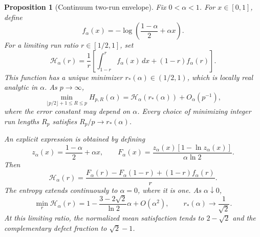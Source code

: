 \documentclass[11pt,a4paper]{article}
\newtheorem{proposition}[theorem]{Proposition}
\begin{document}
\begin{proposition}[Continuum two-run envelope]
\label{prop:continuum_two_run}
Fix $0<\alpha<1$.  For $x\in[0,1]$, define
\[
    f_\alpha(x)=-\log\left(\frac{1-\alpha}{2}+\alpha x\right).
\]
For a limiting run ratio $r\in[1/2,1]$, set
\begin{equation}
\label{eq:continuum_envelope}
    \mathcal H_\alpha(r)=\frac1r\left[
        \int_{1-r}^{r}f_\alpha(x)\,dx+(1-r)f_\alpha(r)
    \right].
\end{equation}
This function has a unique minimizer $r_*(\alpha)\in(1/2,1)$,
which is locally real analytic in $\alpha$.  As $p\to\infty$,
\begin{equation}
\label{eq:continuum_limit}
    \min_{\lfloor p/2\rfloor+1\le R\le p}H_{p,R}(\alpha)
    =\mathcal H_\alpha(r_*(\alpha))+O_\alpha(p^{-1}),
\end{equation}
where the error constant may depend on $\alpha$.  Every choice of
minimizing integer run lengths $R_p$ satisfies
$R_p/p\to r_*(\alpha)$.

An explicit expression is obtained by defining
\[
    z_\alpha(x)=\frac{1-\alpha}{2}+\alpha x,\qquad
    F_\alpha(x)=\frac{z_\alpha(x)[1-\ln z_\alpha(x)]}{\alpha\ln2}.
\]
Then
\begin{equation}
\label{eq:continuum_closed_form}
    \mathcal H_\alpha(r)=
    \frac{F_\alpha(r)-F_\alpha(1-r)+(1-r)f_\alpha(r)}r.
\end{equation}
The entropy extends continuously to $\alpha=0$, where it is one.
As $\alpha\downarrow0$,
\begin{equation}
\label{eq:continuum_weak}
    \min_r\mathcal H_\alpha(r)
    =1-\frac{3-2\sqrt2}{\ln2}\alpha+O(\alpha^2),
    \qquad r_*(\alpha)\longrightarrow\frac1{\sqrt2}.
\end{equation}
At this limiting ratio, the normalized mean satisfaction tends to
$2-\sqrt2$ and the complementary defect fraction to $\sqrt2-1$.
\end{proposition}
\end{document}
